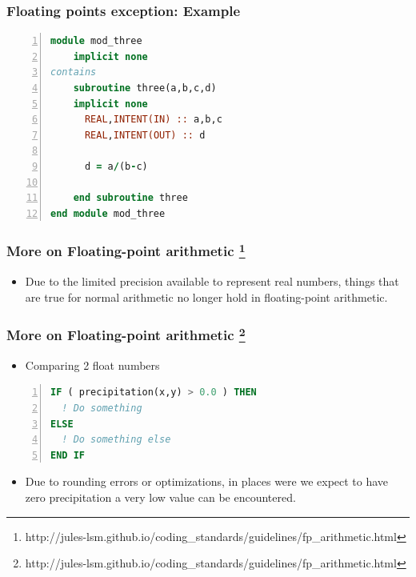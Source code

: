 \documentclass[t]{myBeamer}
\begin{document}
\begin{frame}[fragile,t]
\frametitle{ Floating points exception: Example }
\vspace{-10pt}
\begin{lstlisting}[language=fortran,numbers=left]
module mod_three
    implicit none
contains
    subroutine three(a,b,c,d)
    implicit none
	  REAL,INTENT(IN) :: a,b,c
	  REAL,INTENT(OUT) :: d
	  
	  d = a/(b-c)

    end subroutine three
end module mod_three
\end{lstlisting}

\end{frame}


\begin{frame}[t]
\frametitle{ More on Floating-point arithmetic
\footnote{http://jules-lsm.github.io/coding\_standards/guidelines/fp\_arithmetic.html}}
\Large

\begin{itemize}
 \item Due to the limited precision available to represent real numbers, things that are true for normal arithmetic no longer hold in floating-point arithmetic.
\end{itemize}

\end{frame}

\begin{frame}[fragile,t]
\frametitle{ More on Floating-point arithmetic
\footnote{http://jules-lsm.github.io/coding\_standards/guidelines/fp\_arithmetic.html}}
\Large

\begin{itemize}
 \item Comparing 2 float numbers
\end{itemize}

\begin{lstlisting}[language=fortran,numbers=left]
IF ( precipitation(x,y) > 0.0 ) THEN
  ! Do something
ELSE
  ! Do something else
END IF
\end{lstlisting}


\begin{itemize}
 \item Due to rounding errors or optimizations, in places were we expect to have zero precipitation a very low value can be encountered. 
 \end{itemize}

\end{frame}
\end{document}
